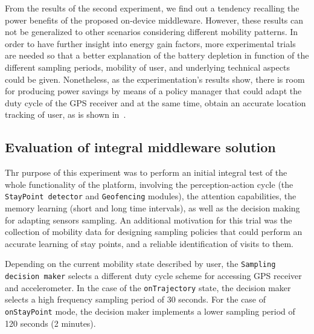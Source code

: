 \documentclass[ENG,PhD]{cinvestav}
\begin{document}
From the results of the second experiment, we find out a tendency recalling the power benefits of the proposed on-device middleware.
However, these results can not be generalized to other scenarios considering different mobility patterns.
In order to have further insight into energy gain factors, more experimental trials are needed so that a better explanation of the battery depletion in function of the different sampling periods, mobility of user, and underlying technical aspects could be given.
Nonetheless, as the experimentation's results show, there is room for producing power savings by means of a policy manager that could adapt the duty cycle of the GPS receiver and at the same time, obtain an accurate location tracking of user, as is shown in~\cite{Paek2010,Lu2010,Chon2014}.

\subsection{Evaluation of integral middleware solution} 
Thr purpose of this experiment was to perform an initial integral test of the whole functionality of the platform, involving the perception-action cycle (the \texttt{StayPoint detector} and \texttt{Geofencing} modules), the attention capabilities, the memory learning (short and long time intervals), as well as the decision making for adapting sensors sampling.
An additional motivation for this trial was the collection of mobility data for designing sampling policies that could perform an accurate learning of stay points, and a reliable identification of visits to them.

Depending on the current mobility state described by user, the \texttt{Sampling decision maker} selects a different duty cycle scheme for accessing GPS receiver and accelerometer.
In the case of the \texttt{onTrajectory} state, the decision maker selects a high frequency sampling period of 30 seconds.
For the case of \texttt{onStayPoint} mode, the decision maker implements a lower sampling period of 120 seconds (2 minutes).
\end{document}
